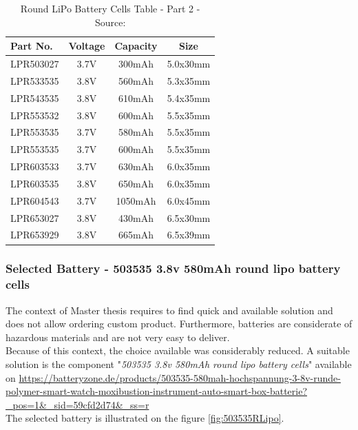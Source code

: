 \documentclass[report.tex]{subfiles}
\begin{document}
\begin{table}[H]
\centering
\begin{tabular}{|l|c|c|c|}\hline
Part No.		&	Voltage 	&	Capacity		&	Size		\\\hline
LPR503027	&	3.7V 	& 	300mAh		&	5.0x30mm \\\hline
LPR533535	&	3.8V 	& 	560mAh		&	5.3x35mm \\\hline
LPR543535	&	3.8V 	&	610mAh		&	5.4x35mm \\\hline
LPR553532	&	3.8V 	& 	600mAh		&	5.5x35mm \\
LPR553535	&	3.7V 	& 	580mAh		&	5.5x35mm \\
LPR553535	&	3.7V 	& 	600mAh		&	5.5x35mm \\\hline
LPR603533	&	3.7V 	& 	630mAh		&	6.0x35mm \\
LPR603535	&	3.8V 	& 	650mAh		&	6.0x35mm \\
LPR604543	&	3.7V 	& 	1050mAh		&	6.0x45mm \\\hline
LPR653027	&	3.8V 	& 	430mAh		&	6.5x30mm \\
LPR653929	&	3.8V 	& 	665mAh		&	6.5x39mm \\\hline
\end{tabular}
\caption{Round LiPo Battery Cells Table - Part 2 - Source:\cite{roundLipoCell}}
\label{tab:roundLipoCell2}
\end{table}

\subsubsection{Selected Battery - 503535 3.8v 580mAh round lipo battery cells}

The context of Master thesis requires to find quick and available solution and does not allow ordering custom product. Furthermore, batteries are considerate of hazardous materials and are not very easy to deliver.\\

Because of this context, the choice available was considerably reduced. A suitable solution is the component "\textit{503535 3.8v 580mAh round lipo battery cells}" available on \url{https://batteryzone.de/products/503535-580mah-hochspannung-3-8v-runde-polymer-smart-watch-moxibustion-instrument-auto-smart-box-batterie?_pos=1&_sid=59cfd2d74&_ss=r}\\

The selected battery is illustrated on the figure \ref{fig:503535RLipo}.
\end{document}
